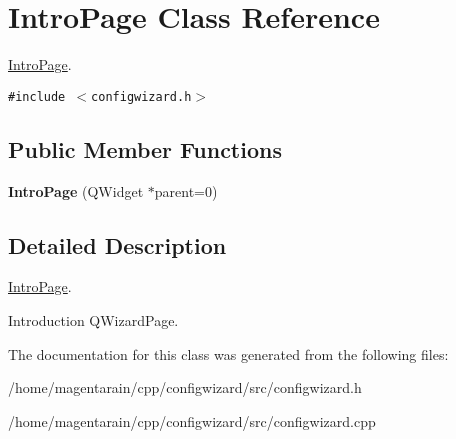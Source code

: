 \hypertarget{classIntroPage}{
\section{IntroPage Class Reference}
\label{classIntroPage}
}
\hyperlink{classIntroPage}{IntroPage}.  


{\tt \#include $<$configwizard.h$>$}

\subsection*{Public Member Functions}
\begin{CompactItemize}
\item 
\hypertarget{classIntroPage_1542ddeba40ea1e6d5f968829876c95d}{
\textbf{IntroPage} (QWidget $\ast$parent=0)}
\label{classIntroPage_1542ddeba40ea1e6d5f968829876c95d}

\end{CompactItemize}


\subsection{Detailed Description}
\hyperlink{classIntroPage}{IntroPage}. 

Introduction QWizardPage. 

The documentation for this class was generated from the following files:\begin{CompactItemize}
\item 
/home/magentarain/cpp/configwizard/src/configwizard.h\item 
/home/magentarain/cpp/configwizard/src/configwizard.cpp\end{CompactItemize}
